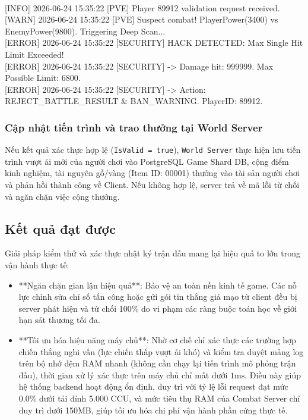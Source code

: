 \documentclass[../Project.tex]{subfiles}
\begin{document}
{\begin{minipage}{\dimexpr\textwidth-2\fboxsep\relax}
\\
{[INFO] 2026-06-24 15:35:22 [PVE] Player 89912 validation request received.}\\
{[WARN] 2026-06-24 15:35:22 [PVE] Suspect combat! PlayerPower(3400) vs EnemyPower(9800). Triggering Deep Scan...}\\
{[ERROR] 2026-06-24 15:35:22 [SECURITY] HACK DETECTED: Max Single Hit Limit Exceeded!}\\
{[ERROR] 2026-06-24 15:35:22 [SECURITY] -> Damage hit: 999999. Max Possible Limit: 6800.}\\
{[ERROR] 2026-06-24 15:35:22 [SECURITY] -> Action: REJECT\_BATTLE\_RESULT \& BAN\_WARNING. PlayerID: 89912.}
\end{minipage}
}
\vspace{0.3cm}

\subsubsection{Cập nhật tiến trình và trao thưởng tại World Server}
Nếu kết quả xác thực hợp lệ (\texttt{IsValid = true}), \texttt{World Server} thực hiện lưu tiến trình vượt ải mới của người chơi vào PostgreSQL Game Shard DB, cộng điểm kinh nghiệm, tài nguyên gỗ/vàng (Item ID: 00001) thưởng vào tài sản người chơi và phản hồi thành công về Client. Nếu không hợp lệ, server trả về mã lỗi từ chối và ngăn chặn việc cộng thưởng.

\subsection{Kết quả đạt được}
Giải pháp kiểm thử và xác thực nhật ký trận đấu mang lại hiệu quả to lớn trong vận hành thực tế:
\begin{itemize}
    \item **Ngăn chặn gian lận hiệu quả**: Bảo vệ an toàn nền kinh tế game. Các nỗ lực chỉnh sửa chỉ số tấn công hoặc gửi gói tin thắng giả mạo từ client đều bị server phát hiện và từ chối 100\% do vi phạm các ràng buộc toán học về giới hạn sát thương tối đa.
    \item **Tối ưu hóa hiệu năng máy chủ**: Nhờ cơ chế chỉ xác thực các trường hợp chiến thắng nghi vấn (lực chiến thấp vượt ải khó) và kiểm tra duyệt mảng log trên bộ nhớ đệm RAM nhanh (không cần chạy lại tiến trình mô phỏng trận đấu), thời gian xử lý xác thực trên máy chủ chỉ mất dưới \(1\text{ms}\). Điều này giúp hệ thống backend hoạt động ổn định, duy trì với tỷ lệ lỗi request đạt mức 0.0\% dưới tải đỉnh 5.000 CCU, và mức tiêu thụ RAM của Combat Server chỉ duy trì dưới 150MB, giúp tối ưu hóa chi phí vận hành phần cứng thực tế.
\end{itemize}
\end{document}
